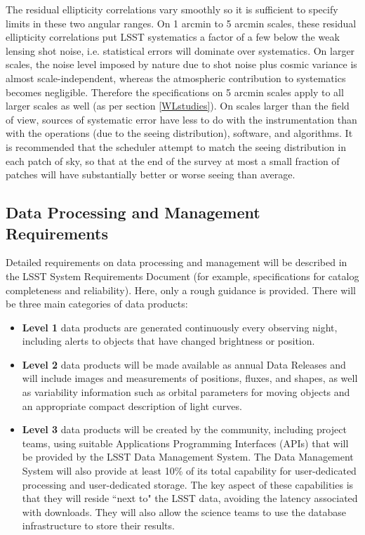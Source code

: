 The residual ellipticity correlations vary smoothly so it is sufficient to specify
limits in these two angular ranges. On 1 arcmin to 5 arcmin scales, these residual
ellipticity correlations put LSST systematics a factor of a few below the
weak lensing shot noise, i.e. statistical errors will dominate over systematics.
On larger scales, the noise level imposed by nature due to shot noise plus
cosmic variance is almost scale-independent, whereas the atmospheric
contribution to systematics becomes negligible.  Therefore the
specifications on 5 arcmin scales apply to all larger scales as well
(as per section \ref{WLstudies}).  On scales larger than the field of view, sources of
systematic error have less to do with the instrumentation than with the operations
(due to the seeing distribution), software, and algorithms.  It is recommended
that the scheduler attempt to match the seeing distribution in each
patch of sky, so that at the end of the survey at most a small fraction
of patches will have substantially better or worse seeing than average.



\subsection{Data Processing and Management Requirements}

Detailed requirements on data processing and management will be described
in the LSST System Requirements Document (for example, specifications for catalog completeness
and reliability). Here, only a rough guidance is provided. There will be three
main categories of data products:

\begin{itemize}
\item {\bf Level 1} data products are generated continuously every observing night,
including alerts to objects that have changed brightness or position.
\item {\bf Level 2} data products will be made available as annual Data Releases
and will include images and measurements of positions, fluxes, and shapes, as well
as variability information such as orbital parameters for moving objects and
an appropriate compact description of light curves.
\item {\bf Level 3} data products will be created by the community, including project teams,
using suitable Applications Programming Interfaces (APIs) that will be provided
by the LSST Data Management System. The Data Management System will also provide
at least 10\% of its total capability for user-dedicated processing and user-dedicated storage.
The key aspect of these capabilities is that they will reside ``next to" the LSST data,
avoiding the latency associated with downloads. They will also allow the science
teams to use the database infrastructure to store their results.
\end{itemize}


